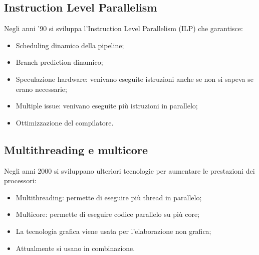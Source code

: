 \subsection{Instruction Level Parallelism}

Negli anni '90 si sviluppa l'Instruction Level Parallelism (ILP) che garantisce:

\begin{itemize}
    \item Scheduling dinamico della pipeline;
    \item Branch prediction dinamico;
    \item Speculazione hardware: venivano eseguite istruzioni
    anche se non si sapeva se erano necessarie;
    \item Multiple issue: venivano eseguite più istruzioni
    in parallelo;
    \item Ottimizzazione del compilatore.
\end{itemize}

\subsection{Multithreading e multicore}

Negli anni 2000 si sviluppano ulteriori tecnologie per aumentare
le prestazioni dei processori:

\begin{itemize}
    \item Multithreading: permette di eseguire più thread in parallelo;
    \item Multicore: permette di eseguire codice parallelo su più core;
    \item La tecnologia grafica viene usata per l'elaborazione non grafica;
    \item Attualmente si usano in combinazione.
\end{itemize}